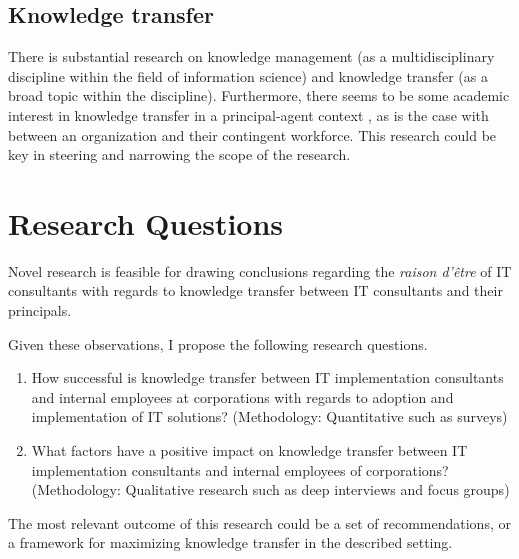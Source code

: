 \documentclass[12pt]{article}
\begin{document}
\hypertarget{knowledge-transfer}{%
\subsection{Knowledge transfer}\label{knowledge-transfer}}

There is substantial research on knowledge management (as a
multidisciplinary discipline within the field of information science)
and knowledge transfer (as a broad topic within the discipline).
Furthermore, there seems to be some academic interest in knowledge
transfer in a principal-agent context \citep{ning2008, haines2003}, as
is the case with between an organization and their contingent workforce.
This research could be key in steering and narrowing the scope of the
research.

\hypertarget{research-questions}{%
\section{Research Questions}\label{research-questions}}

Novel research is feasible for drawing conclusions regarding the
\emph{raison d'être} of IT consultants with regards to knowledge
transfer between IT consultants and their principals.

Given these observations, I propose the following research questions.

\begin{enumerate}
\def\labelenumi{\arabic{enumi}.}
\item
  How successful is knowledge transfer between IT implementation
  consultants and internal employees at corporations with regards to
  adoption and implementation of IT solutions? (Methodology:
  Quantitative such as surveys)
\item
  What factors have a positive impact on knowledge transfer between IT
  implementation consultants and internal employees of corporations?
  (Methodology: Qualitative research such as deep interviews and focus
  groups)
\end{enumerate}

The most relevant outcome of this research could be a set of
recommendations, or a framework for maximizing knowledge transfer in the
described setting.



\end{document}
